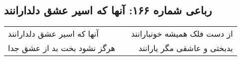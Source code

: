 \begin{center}
\section*{رباعی شماره ۱۶۶: آنها که اسیر عشق دلدارانند}
\label{sec:sh166}
\begin{longtable}{l p{0.5cm} r}
آنها که اسیر عشق دلدارانند
&&
از دست فلک همیشه خونبارانند
\\
هرگز نشود بخت بد از عشق جدا
&&
بدبختی و عاشقی مگر یارانند
\\
\end{longtable}
\end{center}
